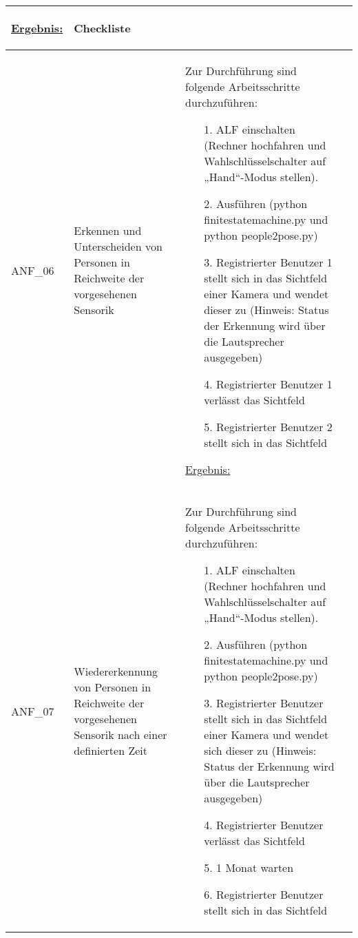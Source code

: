 \documentclass[12pt,a4paper,oneside,numbers=noenddot,captions=tableheading,toc=bibliography,openany,tikz,margin=5mm]{scrbook}
\begin{document}
\begin{longtable}{|p{}|p{}|p{7cm}|p{}|}
\begin{itemize}
\end{itemize}
\underline{Ergebnis:}\newline

\textbf{} %
& 	Checkliste
\\
	\hline

ANF\_06 & Erkennen und Unterscheiden von Personen in Reichweite der vorgesehenen Sensorik & Zur Durchführung sind folgende Arbeitsschritte durchzuführen:
\begin{itemize}
	
	\item[1.]	ALF einschalten (Rechner hochfahren und Wahlschlüsselschalter auf „Hand“-Modus stellen).
	\item[2.]	Ausführen (python finitestatemachine.py und python people2pose.py)
	\item[3.]	Registrierter Benutzer 1 stellt sich in das Sichtfeld einer Kamera und wendet dieser zu (Hinweis: Status der Erkennung wird über die Lautsprecher ausgegeben)
	\item[4.]	Registrierter Benutzer 1 verlässt das Sichtfeld
	\item[5.]	Registrierter Benutzer 2 stellt sich in das Sichtfeld 
	
	
\end{itemize}

\underline{Ergebnis:}\newline
\newline

\textbf{}	%
& 
\\
\hline

ANF\_07 & Wiedererkennung von Personen in Reichweite der vorgesehenen Sensorik nach einer definierten Zeit & Zur Durchführung sind folgende Arbeitsschritte durchzuführen:
\begin{itemize}
	\item[1.]	ALF einschalten (Rechner hochfahren und Wahlschlüsselschalter auf „Hand“-Modus stellen).
\item[2.]	Ausführen (python finitestatemachine.py und python people2pose.py)
\item[3.]   Registrierter Benutzer stellt sich in das Sichtfeld einer Kamera und wendet sich dieser zu (Hinweis: Status der Erkennung wird über die Lautsprecher ausgegeben)
\item[4.]	Registrierter Benutzer verlässt das Sichtfeld
\item[5.]   1 Monat warten
\item[6.]	Registrierter Benutzer stellt sich in das Sichtfeld 
	

\end{itemize}
\end{longtable}
\end{document}
